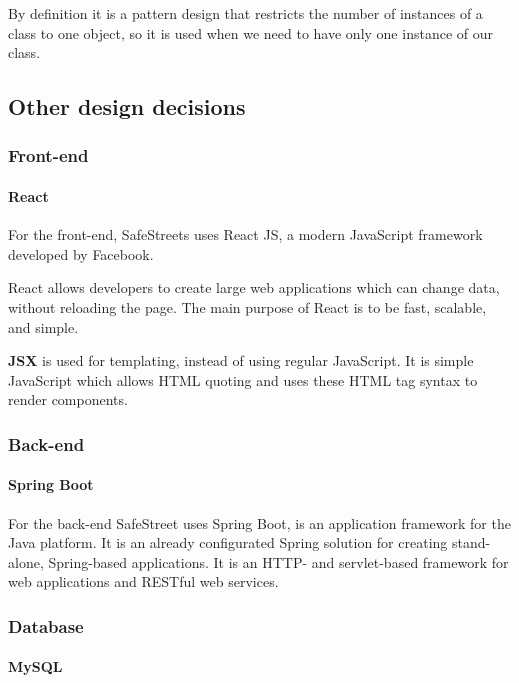 By definition it is a pattern design that restricts the number of instances of a class to one object, so it is used when we need to have only one instance of our class.


\subsection{Other design decisions}

\subsubsection{Front-end}

\paragraph{React}

For the front-end, SafeStreets uses React JS, a modern JavaScript framework developed by Facebook.

React allows developers to create large web applications which can change data, without reloading the page. The main purpose of React is to be fast, scalable, and simple.

\textbf{JSX} is used for templating, instead of using regular JavaScript. It is simple JavaScript which allows HTML quoting and uses these HTML tag syntax to render components.

\subsubsection{Back-end}

\paragraph{Spring Boot}

For the back-end SafeStreet uses Spring Boot, is an application framework for the Java platform.
It is an already configurated Spring solution for creating stand-alone, Spring-based applications. It is an HTTP- and servlet-based framework for web applications and RESTful web services.

\subsubsection{Database}

\paragraph{MySQL}

